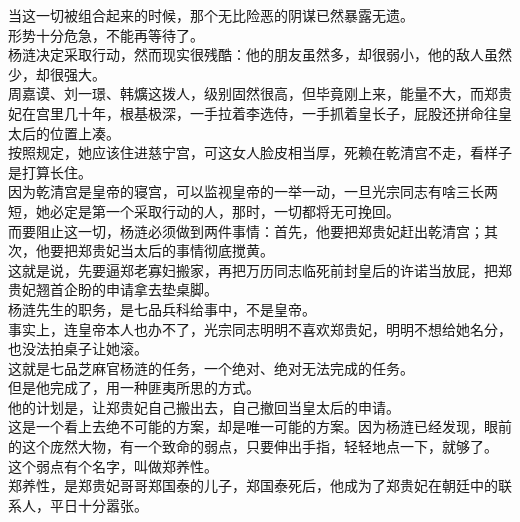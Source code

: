 \begin{multicols}{\theparacolNo}
当这一切被组合起来的时候，那个无比险恶的阴谋已然暴露无遗。\\

形势十分危急，不能再等待了。\\

杨涟决定采取行动，然而现实很残酷：他的朋友虽然多，却很弱小，他的敌人虽然少，却很强大。\\

周嘉谟、刘一璟、韩爌这拨人，级别固然很高，但毕竟刚上来，能量不大，而郑贵妃在宫里几十年，根基极深，一手拉着李选侍，一手抓着皇长子，屁股还拼命往皇太后的位置上凑。\\

按照规定，她应该住进慈宁宫，可这女人脸皮相当厚，死赖在乾清宫不走，看样子是打算长住。\\

因为乾清宫是皇帝的寝宫，可以监视皇帝的一举一动，一旦光宗同志有啥三长两短，她必定是第一个采取行动的人，那时，一切都将无可挽回。\\

而要阻止这一切，杨涟必须做到两件事情：首先，他要把郑贵妃赶出乾清宫；其次，他要把郑贵妃当太后的事情彻底搅黄。\\

这就是说，先要逼郑老寡妇搬家，再把万历同志临死前封皇后的许诺当放屁，把郑贵妃翘首企盼的申请拿去垫桌脚。\\

杨涟先生的职务，是七品兵科给事中，不是皇帝。\\

事实上，连皇帝本人也办不了，光宗同志明明不喜欢郑贵妃，明明不想给她名分，也没法拍桌子让她滚。\\

这就是七品芝麻官杨涟的任务，一个绝对、绝对无法完成的任务。\\

但是他完成了，用一种匪夷所思的方式。\\

他的计划是，让郑贵妃自己搬出去，自己撤回当皇太后的申请。\\

这是一个看上去绝不可能的方案，却是唯一可能的方案。因为杨涟已经发现，眼前的这个庞然大物，有一个致命的弱点，只要伸出手指，轻轻地点一下，就够了。\\

这个弱点有个名字，叫做郑养性。\\

郑养性，是郑贵妃哥哥郑国泰的儿子，郑国泰死后，他成为了郑贵妃在朝廷中的联系人，平日十分嚣张。\\


\end{multicols}
